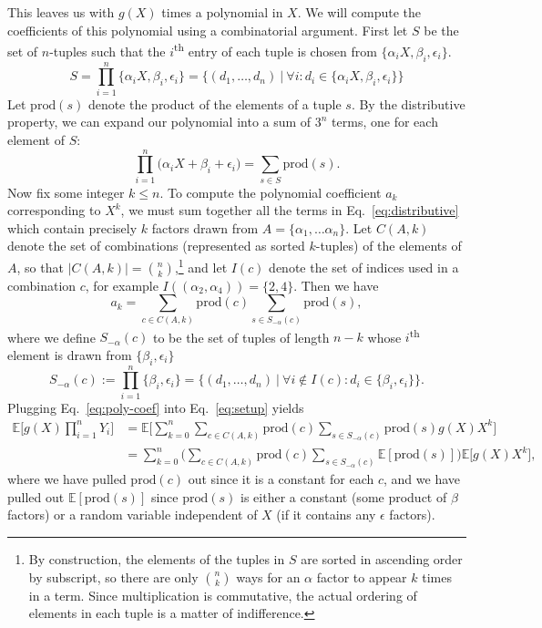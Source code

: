 \documentclass{article}
\theoremstyle{plain}
\theoremstyle{definition}
\theoremstyle{remark}
\newcommand{\E}{\mathbb{E}}
\begin{document}
This leaves us with $g(X)$ times a polynomial in $X$. We will compute the coefficients of this polynomial using a combinatorial argument. First let $S$ be the set of $n$-tuples such that the $i$\textsuperscript{th} entry of each tuple is chosen from $\{ \alpha_i X, \beta_i, \epsilon_i \}$.
\begin{equation}
    S = \prod_{i = 1}^n \{ \alpha_i X, \beta_i, \epsilon_i \} = \big \{ ( d_1, \ldots, d_n) \:|\: \forall i : d_i \in \{ \alpha_i X, \beta_i, \epsilon_i \} \big \}
\end{equation}
Let $\mathrm{prod}(s)$ denote the product of the elements of a tuple $s$. By the distributive property, we can expand our polynomial into a sum of $3^n$ terms, one for each element of $S$:
\begin{equation}\label{eq:distributive}
    \prod_{i = 1}^{n} \big ( \alpha_i X + \beta_i + \epsilon_i \big ) = \sum_{s \in S} \mathrm{prod}(s).
\end{equation}
Now fix some integer $k \leq n$. To compute the polynomial coefficient $a_k$ corresponding to $X^k$, we must sum together all the terms in Eq.~\ref{eq:distributive} which contain precisely $k$ factors drawn from $A = \{ \alpha_1, \ldots \alpha_n \}$. Let $C(A, k)$ denote the set of combinations (represented as sorted $k$-tuples) of the elements of $A$, so that $|C(A, k)| = \binom{n}{k}$,\footnote{By construction, the elements of the tuples in $S$ are sorted in ascending order by subscript, so there are only $\binom{n}{k}$ ways for an $\alpha$ factor to appear $k$ times in a term. Since multiplication is commutative, the actual ordering of elements in each tuple is a matter of indifference.} and let $I(c)$ denote the set of indices used in a combination $c$, for example $I ( ( \alpha_2, \alpha_4 ) ) = \{ 2, 4 \}$. Then we have
\begin{equation}\label{eq:poly-coef}
    a_k = \sum_{c \in C(A, k)} \mathrm{prod}(c) \sum_{s \in S_{-\alpha}(c)}  \mathrm{prod}(s),
\end{equation}
where we define $S_{-\alpha}(c)$ to be the set of tuples of length $n - k$ whose $i$\textsuperscript{th} element is drawn from $\{ \beta_i, \epsilon_i \}$
\begin{equation}
    S_{-\alpha}(c) := \prod_{i = 1}^n \{ \beta_i, \epsilon_i \} = \big \{ ( d_1, \ldots, d_n) \:|\: \forall i \notin I(c) : d_i \in \{ \beta_i, \epsilon_i \} \big \}.
\end{equation}
Plugging Eq.~\ref{eq:poly-coef} into Eq.~\ref{eq:setup} yields
\begin{align}
    \E \Big [g(X) \prod_{i = 1}^{n} Y_i \Big ] &= \E \Big [ \sum_{k = 0}^{n} \sum_{c \in C(A, k)} \mathrm{prod}(c) \sum_{s \in S_{-\alpha}(c)}  \mathrm{prod}(s) g(X) X^k \Big ]\\
    &= \sum_{k = 0}^{n} \Big ( \sum_{c \in C(A, k)} \mathrm{prod}(c) \sum_{s \in S_{-\alpha}(c)} \E[ \mathrm{prod}(s) ] \Big ) \E \big [ g(X) X^k \big ],
\end{align}
where we have pulled $\mathrm{prod}(c)$ out since it is a constant for each $c$, and we have pulled out $\E[ \mathrm{prod}(s) ]$ since $\mathrm{prod}(s)$ is either a constant (some product of $\beta$ factors) or a random variable independent of $X$ (if it contains any $\epsilon$ factors).
\end{document}
